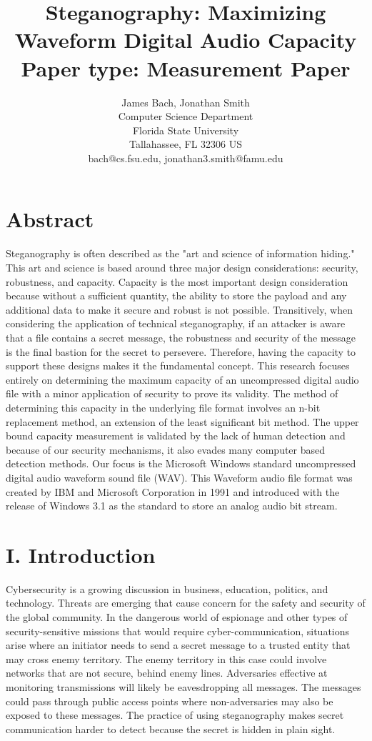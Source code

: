 \documentclass[letterpaper]{article}
\title{Steganography: Maximizing Waveform Digital Audio Capacity\\
Paper type: Measurement Paper }
\author{James Bach, Jonathan Smith\\
Computer Science Department\\
Florida State University\\
Tallahassee, FL 32306  US\\
bach@cs.fsu.edu, jonathan3.smith@famu.edu\\
}
\begin{document}
 
\maketitle

\section{Abstract}
Steganography is often described as the "art and science of information hiding." This art and science is based around three major design considerations: security, robustness, and capacity. Capacity is the most important design consideration because without a sufficient quantity, the ability to store the payload and any additional data to make it secure and robust is not possible. Transitively, when considering the application of technical steganography, if an attacker is aware that a file contains a secret message, the robustness and security of the message is the final bastion for the secret to persevere. Therefore, having the capacity to support these designs makes it the fundamental concept. This research focuses entirely on determining the maximum capacity of an uncompressed digital audio file with a minor application of security to prove its validity. The method of determining this capacity in the underlying file format involves an n-bit replacement method, an extension of the least significant bit method. The upper bound capacity measurement is validated by the lack of human detection and because of our security mechanisms, it also evades many computer based detection methods. Our focus is the Microsoft Windows standard uncompressed digital audio waveform sound file (WAV). This Waveform audio file format was created by IBM and Microsoft Corporation in 1991 and introduced with the release of Windows 3.1 as the standard to store an analog audio bit stream.     


\section{I. Introduction}

Cybersecurity is a growing discussion in business, education, politics, and technology. Threats are emerging that cause concern for the safety and security of the global community. In the dangerous world of espionage and other types of security-sensitive missions that would require cyber-communication, situations arise where an initiator needs to send a secret message to a trusted entity that may cross enemy territory. The enemy territory in this case could involve networks that are not secure, behind enemy lines. Adversaries effective at monitoring transmissions will likely be eavesdropping all messages. The messages could pass through public access points where non-adversaries may also be exposed to these messages. The practice of using steganography makes secret communication harder to detect because the secret is hidden in plain sight. 
\end{document}

